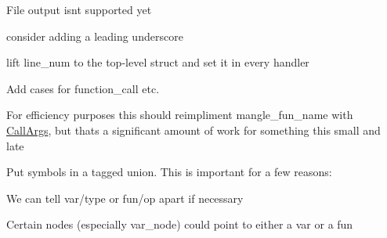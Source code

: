 \begin{DoxyRefList}
\label{todo__todo000008}%
%
File output isn\textquotesingle{}t supported yet  
\item[Member \mbox{\hyperlink{types_8h_a7802b110f7fc71ca5cec0989d835d765}{mangle\+\_\+fun\+\_\+name}} (const char $\ast$const fun\+\_\+name, const \mbox{\hyperlink{struct_args}{Args}} $\ast$const arg\+\_\+types)]\label{todo__todo000013}%
%
consider adding a leading underscore  
\item[Class \mbox{\hyperlink{struct_node}{Node}} ]\label{todo__todo000010}%
%
lift line\+\_\+num to the top-\/level struct and set it in every handler  
\item[Member \mbox{\hyperlink{typecheck_8h_af3bb6eaa8a3d09566c9bb0b721e56cee}{set\+\_\+expr\+\_\+type}} (\mbox{\hyperlink{struct_node}{Node}} $\ast$expr)]\label{todo__todo000011}%
%
Add cases for function\+\_\+call etc.  
\item[Member \mbox{\hyperlink{typecheck_8h_a72edf603fd5c2d60ee57d3d38525a976}{set\+\_\+fun\+\_\+call\+\_\+type}} (\mbox{\hyperlink{struct_node}{Node}} $\ast$call)]\label{todo__todo000012}%
%
For efficiency purposes this should reimpliment mangle\+\_\+fun\+\_\+name with \mbox{\hyperlink{struct_call_args}{Call\+Args}}, but that\textquotesingle{}s a significant amount of work for something this small and late  
\item[Class \mbox{\hyperlink{struct_var_symbol}{Var\+Symbol}} ]\label{todo__todo000009}%
%
Put symbols in a tagged union. This is important for a few reasons\+:
\begin{DoxyEnumerate}
\item We can tell var/type or fun/op apart if necessary
\item Certain nodes (especially var\+\_\+node) could point to either a var or a fun 
\end{DoxyEnumerate}
\end{DoxyRefList}